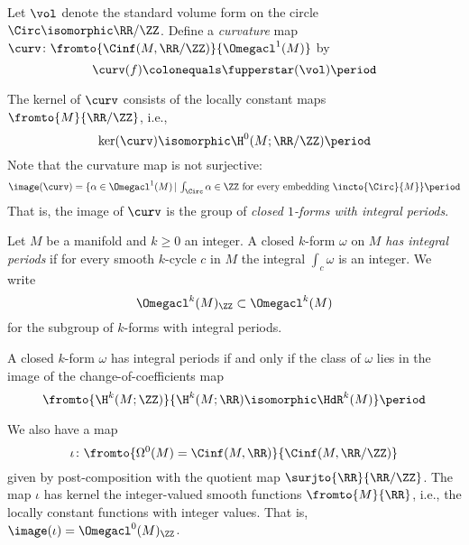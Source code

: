 \begin{construction}
	Let $ \vol $ denote the standard volume form on the circle $ \Circ \isomorphic \RR/\ZZ $.
	Define a \emph{curvature} map $ \curv \colon \fromto{\Cinf(M,\RR/\ZZ)}{\Omegacl^1(M)} $ by
	\begin{equation*}
		\curv(f) \colonequals \fupperstar(\vol) \period
	\end{equation*}
\end{construction}

\begin{nul}
	The kernel of $ \curv $ consists of the locally constant maps $ \fromto{M}{\RR/\ZZ} $, i.e.,
	\begin{equation*}
		\ker(\curv) \isomorphic \H^0(M;\RR/\ZZ) \period
	\end{equation*}
	Note that the curvature map is not surjective:
	\begin{equation*}
		\image(\curv) = \{ \alpha \in \Omegacl^1(M) \, | \, \textstyle\int_{\Circ} \alpha \in \ZZ \text{ for every embedding } \incto{\Circ}{M} \} \period
	\end{equation*}
	That is, the image of $ \curv $ is the group of \textit{closed $ 1 $-forms with integral periods}.
\end{nul}

\begin{definition}
	Let $ M $ be a manifold and $ k \geq 0 $ an integer. 
	A closed $ k $-form $ \omega $ on $ M $ \emph{has integral periods} if for every smooth $ k $-cycle $ c $ in $ M $ the integral $ \int_c \omega $ is an integer.
	We write
	\begin{equation*}
		\Omegacl^k(M)_{\ZZ} \subset \Omegacl^k(M)
	\end{equation*}
	for the subgroup of $ k $-forms with integral periods.
\end{definition}

\begin{remark}
	A closed $ k $-form $ \omega $ has integral periods if and only if the class of $ \omega $ lies in the image of the change-of-coefficients map
	\begin{equation*}
		\fromto{\H^k(M;\ZZ)}{\H^k(M;\RR) \isomorphic \HdR^k(M)} \period 
	\end{equation*}
\end{remark}

\begin{nul}
	We also have a map
	\begin{equation*}
		\iota \colon \fromto{\Omega^0(M) = \Cinf(M,\RR)}{\Cinf(M,\RR/\ZZ)}
	\end{equation*}
	given by post-composition with the quotient map $ \surjto{\RR}{\RR/\ZZ} $.
	The map $ \iota $ has kernel the integer-valued smooth functions $ \fromto{M}{\RR} $, i.e., the locally constant functions with integer values. 
	That is, $ \image(\iota) = \Omegacl^0(M)_{\ZZ} $.
\end{nul}

